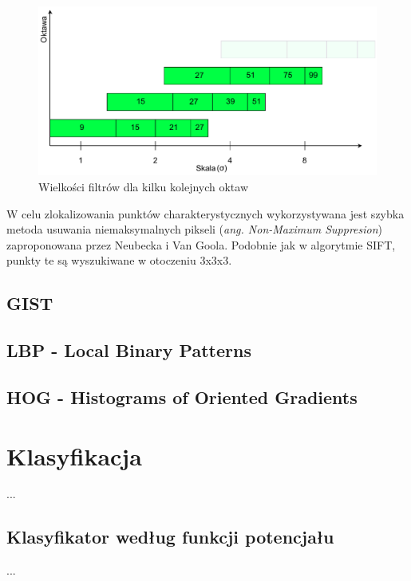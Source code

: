 \begin{figure}[h]
	\centering
	\includegraphics[scale=0.7]{graphics/01_podstawy_teoretyczne/surf-octaves.pdf}
	\caption{Wielkości filtrów dla kilku kolejnych oktaw \cite{BAY08}}
	\label{fig:surf-octaves}
\end{figure}

W celu zlokalizowania punktów charakterystycznych wykorzystywana jest szybka metoda usuwania niemaksymalnych pikseli (\emph{ang. Non-Maximum Suppresion}) zaproponowana przez Neubecka i Van Goola\cite{NEUBECK06}. Podobnie jak w algorytmie SIFT, punkty te są wyszukiwane w otoczeniu 3x3x3.





\subsection{GIST}

\subsection{LBP - Local Binary Patterns}

\subsection{HOG - Histograms of Oriented Gradients}


\section{Klasyfikacja}
...


\subsection{Klasyfikator według funkcji potencjału}
...
	
